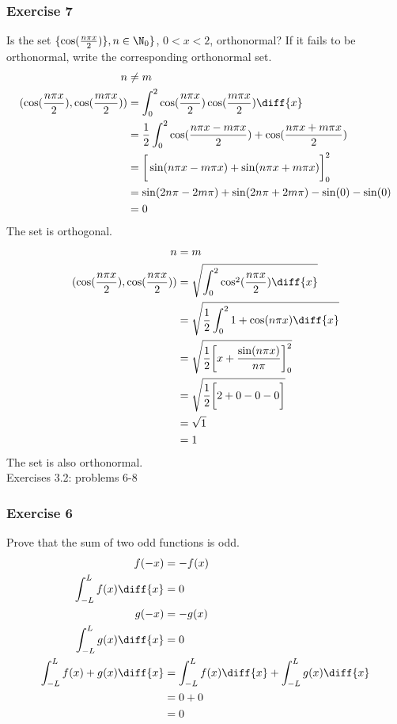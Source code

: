 \documentclass{math}
\begin{document}
\subsubsection*{Exercise 7}
Is the set \( \{\cos(\frac{n\pi x}{2})\}, n\in\N_0\} \), \( 0<x<2 \),
orthonormal? If it fails to be orthonormal, write the corresponding
orthonormal set.
\begin{align*}
  n &\ne m \\
  (\cos(\frac{n\pi x}{2}),\cos(\frac{m\pi x}{2})) &=
    \int_0^2\cos(\frac{n\pi x}{2})\cos(\frac{m\pi x}{2})\diff{x} \\
  &= \frac{1}{2}\int_0^2\cos(\frac{n\pi x-m\pi x}{2})+
    \cos(\frac{n\pi x+m\pi x}{2}) \\
  &= \bigg[\sin(n\pi x-m\pi x)+\sin(n\pi x+m\pi x)\bigg]_0^2 \\
  &= \sin(2n\pi-2m\pi)+\sin(2n\pi+2m\pi)-\sin(0)-\sin(0) \\
  &= 0
\end{align*}
The set is orthogonal.
\begin{align*}
  n &= m \\
  (\cos(\frac{n\pi x}{2}),\cos(\frac{n\pi x}{2})) &=
    \sqrt{\int_0^2\cos^2(\frac{n\pi x}{2})\diff{x}} \\
  &= \sqrt{\frac{1}{2}\int_0^2 1+\cos(n\pi x)\diff{x}} \\
  &= \sqrt{\frac{1}{2}\bigg[x+\frac{\sin(n\pi x)}{n\pi}\bigg]_0^2} \\
  &= \sqrt{\frac{1}{2}\bigg[2+0-0-0\bigg]} \\
  &= \sqrt{1} \\
  &= 1
\end{align*}
The set is also orthonormal. \\

\noindent Exercises 3.2: problems 6-8

\subsubsection*{Exercise 6}
Prove that the sum of two odd functions is odd.
\begin{align*}
  f(-x) &= -f(x) \\
  \int_{-L}^{L}f(x)\diff{x} &= 0 \\
  g(-x) &= -g(x) \\
  \int_{-L}^{L}g(x)\diff{x} &= 0 \\
  \int_{-L}^{L}f(x)+g(x)\diff{x} &= \int_{-L}^{L}f(x)\diff{x}+
    \int_{-L}^{L}g(x)\diff{x} \\
  &= 0+0 \\
  &= 0
\end{align*}
\end{document}
